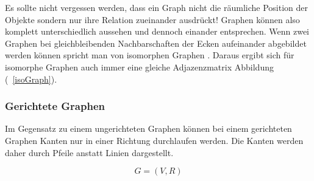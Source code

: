 \documentclass[12pt,a4paper]{article}
\begin{document}
Es sollte nicht vergessen werden, dass ein Graph nicht die räumliche Position der Objekte sondern nur ihre Relation zueinander ausdrückt! Graphen können also komplett unterschiedlich aussehen und dennoch einander entsprechen. Wenn zwei Graphen bei gleichbleibenden Nachbarschaften der Ecken aufeinander abgebildet werden können spricht man von isomorphen Graphen \cite[106]{theory}. Daraus ergibt sich für isomorphe Graphen auch immer eine gleiche Adjazenzmatrix Abbildung (~\ref{isoGraph}).

\subsubsection{Gerichtete Graphen}
Im Gegensatz zu einem ungerichteten Graphen können bei einem gerichteten Graphen Kanten nur in einer Richtung durchlaufen werden. Die Kanten werden daher durch Pfeile anstatt Linien dargestellt. 

$$G = (V,R)$$
\end{document}
